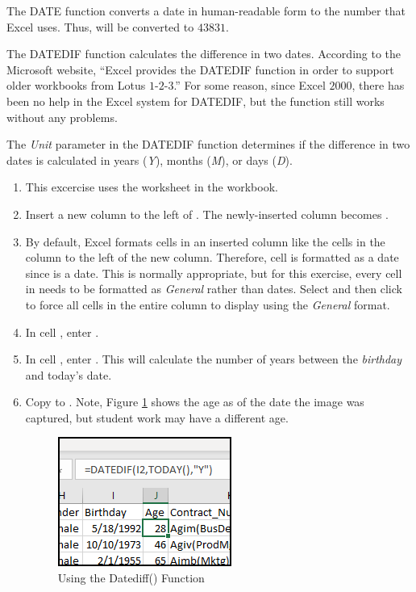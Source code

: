 The DATE function converts a date in human-readable form to the number that Excel uses. Thus,  will be converted to $ 43831 $.

The DATEDIF function calculates the difference in two dates. According to the Microsoft website, ``Excel provides the DATEDIF function in order to support older workbooks from Lotus $ 1 $-$ 2 $-$ 3 $.'' For some reason, since Excel $ 2000 $, there has been no help in the Excel system for DATEDIF, but the function still works without any problems. 

The \textit{Unit} parameter in the DATEDIF function determines if the difference in two dates is calculated in years (\textit{Y}), months (\textit{M}), or days (\textit{D}).

\begin{enumerate}
	\item This excercise uses the  worksheet in the  workbook.
	\item Insert a new column to the left of . The newly-inserted column becomes .
	\item By default, Excel formats cells in an inserted column like the cells in the column to the left of the new column. Therefore, cell  is formatted as a date since  is a date. This is normally appropriate, but for this exercise, every cell in  needs to be formatted as \textit{General} rather than dates. Select  and then click  to force all cells in the entire column to display using the \textit{General} format.
	\item In cell , enter .
	\item In cell , enter . This will calculate the number of years between the \textit{birthday} and today's date. 
	\item Copy  to . Note, Figure \ref{09:fig46} shows the age as of the date the image was captured, but student work may have a different age.
	
	\begin{figure}[H]
		\centering
		\includegraphics[width=\maxwidth{.50\linewidth}]{gfx/ch09_fig46}
		\caption{Using the Datediff() Function}
		\label{09:fig46}
	\end{figure}
	

\end{enumerate}
